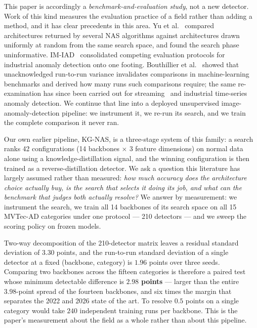 This paper is accordingly a \emph{benchmark-and-evaluation study}, not a new
detector. Work of this kind measures the evaluation practice of a field rather
than adding a method, and it has clear precedents in this area. Yu et
al.~\cite{yu2020evaluating} compared architectures returned by several NAS
algorithms against architectures drawn uniformly at random from the same search
space, and found the search phase uninformative. IM-IAD~\cite{xie2024imiad}
consolidated competing evaluation protocols for industrial anomaly detection onto
one footing. Bouthillier et al.~\cite{bouthillier2021accounting} showed that
unacknowledged run-to-run variance invalidates comparisons in machine-learning
benchmarks and derived how many runs such comparisons require; the same
re-examination has since been carried out for
streaming~\cite{cao2024revisiting} and industrial time-series~\cite{yu2026eventlevel}
anomaly detection. We continue that line into a deployed unsupervised
image-anomaly-detection pipeline: we instrument it, we re-run its search, and we
train the complete comparison it never ran.

Our own earlier pipeline, KG-NAS, is a three-stage system of this family: a search
ranks 42 configurations (14 backbones $\times$ 3 feature dimensions) on normal
data alone using a knowledge-distillation signal, and the winning configuration is
then trained as a reverse-distillation detector. We ask a question this literature
has largely assumed rather than measured: \emph{how much accuracy does the
architecture choice actually buy, is the search that selects it doing its job, and
what can the benchmark that judges both actually resolve?} We answer by
measurement: we instrument the search, we train all 14 backbones of its search
space on all 15 MVTec-AD categories under one protocol --- 210 detectors --- and
we sweep the scoring policy on frozen models.

Two-way decomposition of the 210-detector matrix leaves a residual standard
deviation of $3.30$ points, and the run-to-run standard deviation of a single
detector at a fixed (backbone, category) is $1.96$ points over three seeds.
Comparing two backbones across the fifteen categories is therefore a paired test
whose minimum detectable difference is \textbf{$2.98$ points} --- larger than the
entire $3.98$-point spread of the fourteen backbones, and six times the margin
that separates the 2022 and 2026 state of the art. To resolve $0.5$ points on a
single category would take $240$ independent training runs per backbone. This is
the paper's measurement about the field as a whole rather than about this
pipeline.

